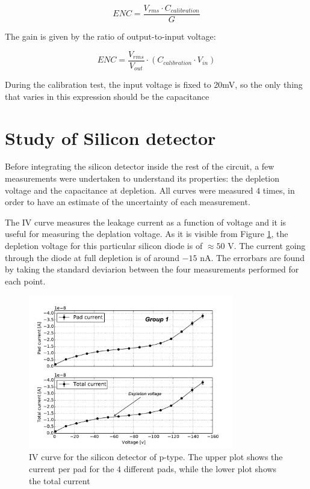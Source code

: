 \documentclass[12pt]{article}
\begin{document}
\begin{equation}
ENC = \frac{V_{rms}\cdot C_{calibration}}{G}
\end{equation}

The gain is given by the ratio of output-to-input voltage:

\begin{equation}
ENC = \frac{V_{rms}}{V_{out}}\cdot\left(C_{calibration}\cdot V_{in}\right)
\end{equation}

During the calibration test, the input voltage is fixed to 20mV, so the only thing that varies in this expression should be the capacitance


\section{Study of Silicon detector}

Before integrating the silicon detector inside the rest of the circuit, a few measurements were undertaken to understand its properties: the depletion voltage and the capacitance at depletion. All curves were measured $4$ times, in order to have an estimate of the uncertainty of each measurement.

The IV curve measures the leakage current as a function of voltage and it is useful for measuring the deplation voltage. As it is visible from Figure \ref{fig:IVcurve}, the depletion voltage for this particular silicon diode is of $\approx 50$ V. The current going through the diode at full depletion is of around $-15$ nA. The errorbars are found by taking the standard deviarion between the four measurements performed for each point.

\begin{figure}[h!]
  \centering
  \includegraphics[width=0.8\textwidth]{./graphics/IV_V_vs_A.pdf}
  \caption{IV curve for the silicon detector of p-type. The upper plot shows the current per pad for the $4$ different pads, while the lower plot shows the total current }
  \label{fig:IVcurve}
\end{figure}
\end{document}
